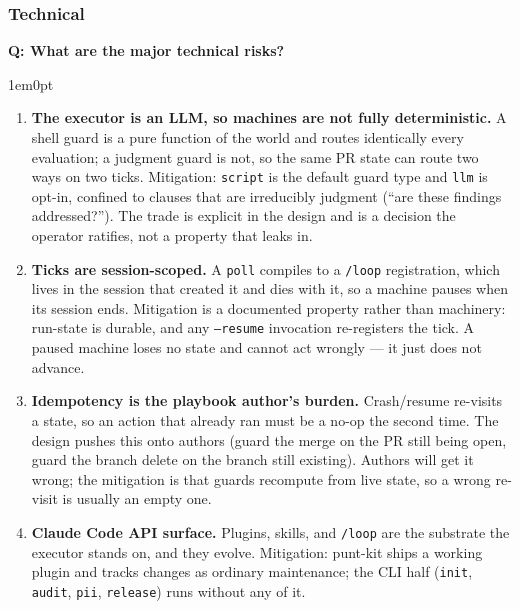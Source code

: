 \documentclass[11pt,letterpaper]{article}
\newcounter{faqnum}
\newenvironment{faqpair}[1]{%
  \needspace{4\baselineskip}%
  \vspace{0.5em}%
  \refstepcounter{faqnum}%
  \noindent\textbf{\color{SectionBlue}Q\thefaqnum: #1}\par\nopagebreak[4]%
  \vspace{0.2em}%
  \begin{adjustwidth}{1em}{0pt}%
  \setlength{\parindent}{0pt}%
}{%
  \end{adjustwidth}%
  \vspace{0.5em}%
}
\begin{document}
\subsubsection*{Technical}

\begin{faqpair}{What are the major technical risks?}\label{faq:tech-risks}
  \begin{enumerate}[nosep]
    \item \textbf{The executor is an LLM, so machines are not fully
      deterministic.} A shell guard is a pure function of the world and routes
      identically every evaluation; a judgment guard is not, so the same PR
      state can route two ways on two ticks. Mitigation: \texttt{script} is the
      default guard type and \texttt{llm} is opt-in, confined to clauses that
      are irreducibly judgment (``are these findings addressed?''). The trade is
      explicit in the design and is a decision the operator ratifies, not a
      property that leaks in.
    \item \textbf{Ticks are session-scoped.} A \texttt{poll} compiles to a
      \texttt{/loop} registration, which lives in the session that created it
      and dies with it, so a machine pauses when its session ends. Mitigation
      is a documented property rather than machinery: run-state is durable, and
      any \texttt{--resume} invocation re-registers the tick. A paused machine
      loses no state and cannot act wrongly --- it just does not advance.
    \item \textbf{Idempotency is the playbook author's burden.} Crash/resume
      re-visits a state, so an action that already ran must be a no-op the
      second time. The design pushes this onto authors (guard the merge on the
      PR still being open, guard the branch delete on the branch still
      existing). Authors will get it wrong; the mitigation is that guards
      recompute from live state, so a wrong re-visit is usually an empty one.
    \item \textbf{Claude Code API surface.} Plugins, skills, and \texttt{/loop}
      are the substrate the executor stands on, and they evolve. Mitigation:
      punt-kit ships a working plugin and tracks changes as ordinary
      maintenance; the CLI half (\texttt{init}, \texttt{audit}, \texttt{pii},
      \texttt{release}) runs without any of it.
  \end{enumerate}
\end{faqpair}
\end{document}
